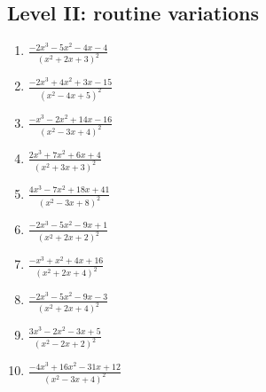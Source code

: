 \documentclass[11pt,oneside]{book}
\begin{document}
\subsection*{Level II: routine variations}
\begin{enumerate}[leftmargin=*,label=\textbf{\arabic*.},itemsep=0.65\baselineskip]
\item $\displaystyle \frac{- 2 x^{3} - 5 x^{2} - 4 x - 4}{\left(x^{2} + 2 x + 3\right)^{2}}$
\item $\displaystyle \frac{- 2 x^{3} + 4 x^{2} + 3 x - 15}{\left(x^{2} - 4 x + 5\right)^{2}}$
\item $\displaystyle \frac{- x^{3} - 2 x^{2} + 14 x - 16}{\left(x^{2} - 3 x + 4\right)^{2}}$
\item $\displaystyle \frac{2 x^{3} + 7 x^{2} + 6 x + 4}{\left(x^{2} + 3 x + 3\right)^{2}}$
\item $\displaystyle \frac{4 x^{3} - 7 x^{2} + 18 x + 41}{\left(x^{2} - 3 x + 8\right)^{2}}$
\item $\displaystyle \frac{- 2 x^{3} - 5 x^{2} - 9 x + 1}{\left(x^{2} + 2 x + 2\right)^{2}}$
\item $\displaystyle \frac{- x^{3} + x^{2} + 4 x + 16}{\left(x^{2} + 2 x + 4\right)^{2}}$
\item $\displaystyle \frac{- 2 x^{3} - 5 x^{2} - 9 x - 3}{\left(x^{2} + 2 x + 4\right)^{2}}$
\item $\displaystyle \frac{3 x^{3} - 2 x^{2} - 3 x + 5}{\left(x^{2} - 2 x + 2\right)^{2}}$
\item $\displaystyle \frac{- 4 x^{3} + 16 x^{2} - 31 x + 12}{\left(x^{2} - 3 x + 4\right)^{2}}$
\end{enumerate}
\end{document}
